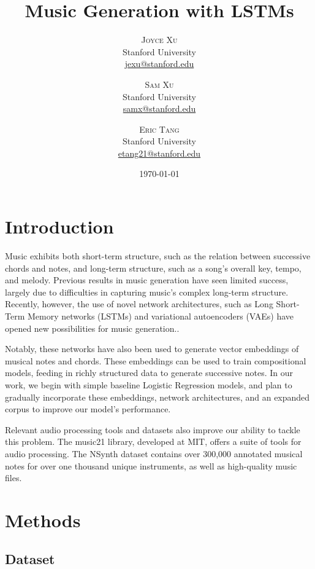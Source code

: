 \documentclass[twoside,twocolumn]{article}
\title{Music Generation with LSTMs} %
\author{%
\textsc{Joyce Xu} \\[1ex] %
\normalsize Stanford University \\ %
\normalsize \href{mailto:jexu@stanford.edu}{jexu@stanford.edu} %
\and %
\textsc{Sam Xu} \\[1ex] %
\normalsize Stanford University \\ %
\normalsize \href{mailto:samx}{samx@stanford.edu} %
\and %
\textsc{Eric Tang} \\[1ex] %
\normalsize Stanford University \\ %
\normalsize \href{mailto:etang21@stanford.edu}{etang21@stanford.edu} %
}
\date{\today} %
\begin{document}
\maketitle


\section{Introduction}

Music exhibits both short-term structure, such as the relation between successive chords and notes, and long-term structure, such as a song's overall key, tempo, and melody. Previous results in music generation have seen limited success, largely due to difficulties in capturing music's complex long-term structure. Recently, however, the use of novel network architectures, such as Long Short-Term Memory networks (LSTMs) and variational autoencoders (VAEs) have opened new possibilities for music generation.\cite{Magenta}.

Notably, these networks have also been used to generate vector embeddings of musical notes and chords. These embeddings can be used to train compositional models, feeding in richly structured data to generate successive notes. In our work, we begin with simple baseline Logistic Regression models, and plan to gradually incorporate these embeddings, network architectures, and an expanded corpus to improve our model's performance.

Relevant audio processing tools and datasets also improve our ability to tackle this problem. The music21 library, developed at MIT, offers a suite of tools for audio processing. The NSynth dataset contains over 300,000 annotated musical notes for over one thousand unique instruments, as well as high-quality music files.\cite{NSynth}



\section{Methods}

\subsection{Dataset}
\end{document}
